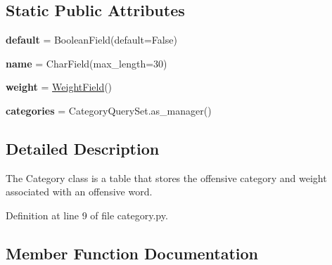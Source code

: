 \subsection*{Static Public Attributes}
\begin{DoxyCompactItemize}
\item 
\mbox{\label{classcapstoneproject_1_1models_1_1models_1_1category_1_1_category_a7fdccdd37f0ecbb4dd11feb7f4f1dba8}} 
{\bfseries default} = Boolean\+Field(default=False)
\item 
\mbox{\label{classcapstoneproject_1_1models_1_1models_1_1category_1_1_category_ad631f9f96a04b7e05f1cd2659c4690d3}} 
{\bfseries name} = Char\+Field(max\+\_\+length=30)
\item 
\mbox{\label{classcapstoneproject_1_1models_1_1models_1_1category_1_1_category_a51406cf34cddf3e7705f125963198e69}} 
{\bfseries weight} = \mbox{\hyperlink{classcapstoneproject_1_1models_1_1fields_1_1weight__field_1_1_weight_field}{Weight\+Field}}()
\item 
\mbox{\label{classcapstoneproject_1_1models_1_1models_1_1category_1_1_category_af3bfd584f62fd349c80b430265b31631}} 
{\bfseries categories} = Category\+Query\+Set.\+as\+\_\+manager()
\end{DoxyCompactItemize}


\subsection{Detailed Description}
\begin{DoxyVerb}The Category class is a table that stores the offensive category and weight
associated with an offensive word.
\end{DoxyVerb}
 

Definition at line 9 of file category.\+py.



\subsection{Member Function Documentation}
\mbox{\label{classcapstoneproject_1_1models_1_1models_1_1category_1_1_category_afe100593a8db752b806a253f93ff10cf}} 
